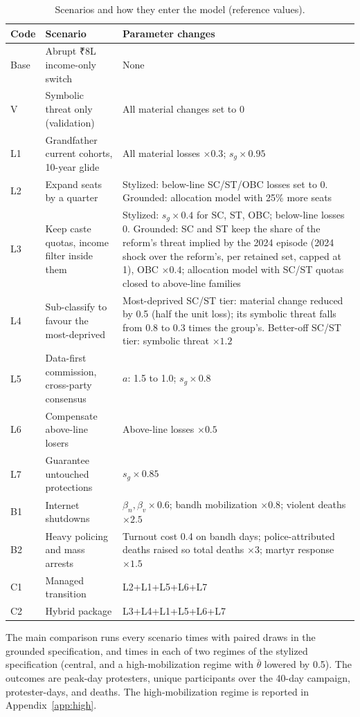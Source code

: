 \documentclass[11pt,a4paper]{article}
\newcommand{\rupee}{{\rupeefont ₹}}
\begin{document}
\begin{table}[H]
\centering\small
\caption{Scenarios and how they enter the model (reference values).}
\label{tab:scenarios}
\begin{tabularx}{\linewidth}{@{}lLL@{}}
\toprule
Code & Scenario & Parameter changes\\
\midrule
Base & Abrupt \rupee8L income-only switch & None\\
V & Symbolic threat only (validation) & All material changes set to 0\\
L1 & Grandfather current cohorts, 10-year glide & All material losses $\times0.3$; $s_g\times0.95$\\
L2 & Expand seats by a quarter & Stylized: below-line SC/ST/OBC losses set to 0. Grounded: allocation model with 25\% more seats\\
L3 & Keep caste quotas, income filter inside them & Stylized: $s_g\times0.4$ for SC, ST, OBC; below-line losses 0. Grounded: SC and ST keep the share of the reform's threat implied by the 2024 episode (2024 shock over the reform's, per retained set, capped at 1), OBC $\times0.4$; allocation model with SC/ST quotas closed to above-line families\\
L4 & Sub-classify to favour the most-deprived & Most-deprived SC/ST tier: material change reduced by 0.5 (half the unit loss); its symbolic threat falls from 0.8 to 0.3 times the group's. Better-off SC/ST tier: symbolic threat $\times1.2$\\
L5 & Data-first commission, cross-party consensus & $a$: 1.5 to 1.0; $s_g\times0.8$\\
L6 & Compensate above-line losers & Above-line losses $\times0.5$\\
L7 & Guarantee untouched protections & $s_g\times0.85$\\
B1 & Internet shutdowns & $\beta_n,\beta_v\times0.6$; bandh mobilization $\times0.8$; violent deaths $\times2.5$\\
B2 & Heavy policing and mass arrests & Turnout cost 0.4 on bandh days; police-attributed deaths raised so total deaths $\times3$; martyr response $\times1.5$\\
C1 & Managed transition & L2+L1+L5+L6+L7\\
C2 & Hybrid package & L3+L4+L1+L5+L6+L7\\
\bottomrule
\end{tabularx}
\end{table}

The main comparison runs every scenario \RunCountGrounded{} times with paired draws in the grounded specification, and \RunCountCentral{} times in each of two regimes of the stylized specification (central, and a high-mobilization regime with $\bar\theta$ lowered by 0.5). The outcomes are peak-day protesters, unique participants over the 40-day campaign, protester-days, and deaths. The high-mobilization regime is reported in Appendix~\ref{app:high}.
\end{document}
